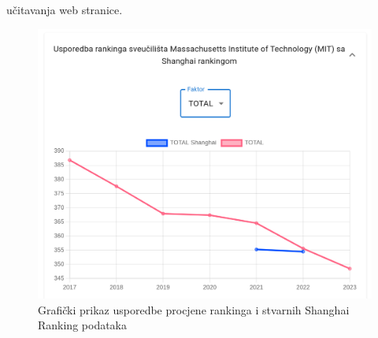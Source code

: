\documentclass[times, utf8, zavrsni]{fer}
\begin{document}
učitavanja web stranice.
\begin{figure}[htb]
    \centering
       \includegraphics[scale=0.3]{uni4.png} 
       \caption{Grafički prikaz usporedbe procjene rankinga i stvarnih Shanghai Ranking podataka}
       \label{fig:uni4}
       \end{figure} 
\end{document}
